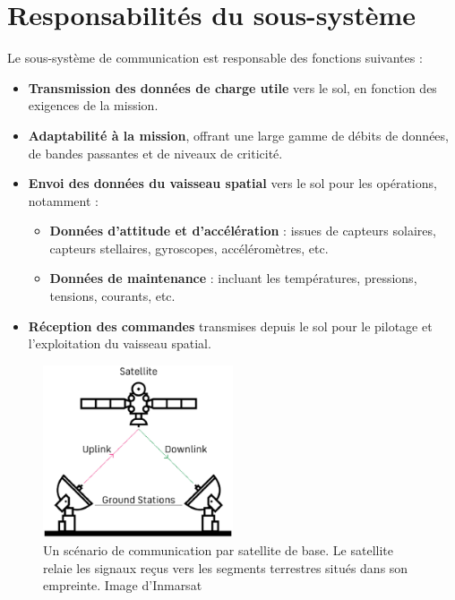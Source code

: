 \section{Responsabilités du sous-système} %
Le sous-système de communication est responsable des fonctions suivantes :

\renewcommand{\labelitemi}{$\bullet$}
\begin{itemize}
    \item \textbf{Transmission des données de charge utile} vers le sol, en fonction des exigences de la mission.
    \item \textbf{Adaptabilité à la mission}, offrant une large gamme de débits de données, de bandes passantes et de niveaux de criticité.
    \item \textbf{Envoi des données du vaisseau spatial} vers le sol pour les opérations, notamment :
    \begin{itemize}
    		
        \item \textbf{Données d’attitude et d’accélération} : issues de capteurs solaires, capteurs stellaires, gyroscopes, accéléromètres, etc.
        \item \textbf{Données de maintenance} : incluant les températures, pressions, tensions, courants, etc.
    \end{itemize}
    
    \item \textbf{Réception des commandes} transmises depuis le sol pour le pilotage et l'exploitation du vaisseau spatial.
\end{itemize}

\begin{figure}[H] %
    \centering
    \includegraphics[width=0.5\textwidth]{figures/6-120.eps}
    
    \caption{Un scénario de communication par satellite de base. Le satellite relaie les signaux reçus vers les segments terrestres situés dans son empreinte. Image d'Inmarsat}
    \label{fig:communication2}
\end{figure}



